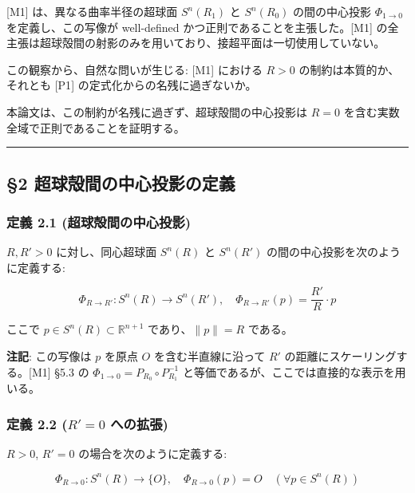 \documentclass[
  a4paper]{ltjsarticle}
\begin{document}
{[}M1{]} は、異なる曲率半径の超球面 \(S^n(R_1)\) と \(S^n(R_0)\)
の間の中心投影 \(\Phi_{1 \to 0}\) を定義し、この写像が well-defined
かつ正則であることを主張した。{[}M1{]}
の全主張は超球殻間の射影のみを用いており、接超平面は一切使用していない。

この観察から、自然な問いが生じる: {[}M1{]} における \(R > 0\)
の制約は本質的か、それとも {[}P1{]} の定式化からの名残に過ぎないか。

本論文は、この制約が名残に過ぎず、超球殻間の中心投影は \(R = 0\)
を含む実数全域で正則であることを証明する。

\begin{center}\rule{0.5\linewidth}{0.5pt}\end{center}

\subsection{§2
超球殻間の中心投影の定義}\label{ux8d85ux7403ux6bbbux9593ux306eux4e2dux5fc3ux6295ux5f71ux306eux5b9aux7fa9}

\subsubsection{定義 2.1
(超球殻間の中心投影)}\label{ux5b9aux7fa9-2.1-ux8d85ux7403ux6bbbux9593ux306eux4e2dux5fc3ux6295ux5f71}

\(R, R' > 0\) に対し、同心超球面 \(S^n(R)\) と \(S^n(R')\)
の間の中心投影を次のように定義する:

\[
\Phi_{R \to R'} : S^n(R) \to S^n(R'), \quad \Phi_{R \to R'}(p) = \frac{R'}{R} \cdot p
\]

ここで \(p \in S^n(R) \subset \mathbb{R}^{n+1}\) であり、\(\|p\| = R\)
である。

\textbf{注記}: この写像は \(p\) を原点 \(O\) を含む半直線に沿って \(R'\)
の距離にスケーリングする。{[}M1{]} §5.3 の
\(\Phi_{1 \to 0} = P_{R_0} \circ P_{R_1}^{-1}\)
と等価であるが、ここでは直接的な表示を用いる。

\subsubsection{\texorpdfstring{定義 2.2 (\(R' = 0\)
への拡張)}{定義 2.2 (R\textquotesingle{} = 0 への拡張)}}\label{ux5b9aux7fa9-2.2-r-0-ux3078ux306eux62e1ux5f35}

\(R > 0\), \(R' = 0\) の場合を次のように定義する:

\[
\Phi_{R \to 0} : S^n(R) \to \{O\}, \quad \Phi_{R \to 0}(p) = O \quad (\forall p \in S^n(R))
\]
\end{document}
